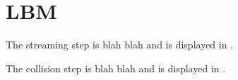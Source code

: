\documentclass{article}
\begin{document}
\section{LBM}

The streaming step is blah blah and is displayed in .


The collision step is blah blah and is displayed in .

\end{document}
